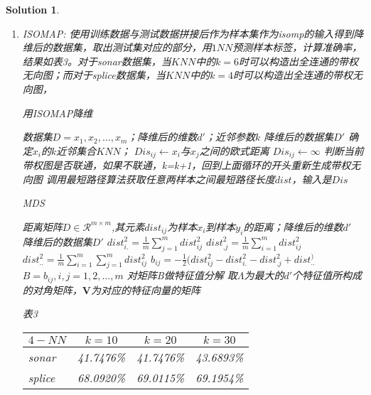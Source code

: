 \documentclass[a4paper,UTF8]{article}
\numberwithin{equation}{section}
\newtheorem*{solution}{Solution}
\begin{document}
\begin{solution}
\begin{enumerate}
			\item ISOMAP:
			\subitem 使用训练数据与测试数据拼接后作为样本集作为isomp的输入得到降维后的数据集，取出测试集对应的部分，用$1NN$预测样本标签，计算准确率，结果如表3。对于sonar数据集，当$KNN$中的$k=6$时可以构造出全连通的带权无向图；而对于splice数据集，当$KNN$中的$k=4$时可以构造出全连通的带权无向图，
			\begin{algorithm}
				\caption{用ISOMAP降维}
				\begin{algorithmic}[1] %
					\Require 数据集$D={x_1,x_2,\ldots,x_m}$；降维后的维数$d'$；近邻参数$k$
					\Ensure 降维后的数据集$D'$
					\State 确定$x_i$的$k$近邻集合$KNN$；
					\State $Dis_{ij} \leftarrow x_i$与$x_j$之间的欧式距离
					\Else
					\State $Dis_{ij} \leftarrow \infty$
					\EndIf
					\EndFor
					\EndFor
					判断当前带权图是否联通，如果不联通，k=k+1，回到上面循环的开头重新生成带权无向图
					\State 调用最短路径算法获取任意两样本之间最短路径长度$dist$，输入是$Dis$
					\State {}
					\EndFunction
				\end{algorithmic}
			\end{algorithm}
			
			\begin{algorithm}
				\caption{MDS}
				\begin{algorithmic}[1] %
					\Require 距离矩阵$D \in \mathcal{R}^{m\times m}$,其元素$dist_{ij}$为样本$x_i$到样本$y_i$的距离；降维后的维数$d'$
					\Ensure 降维后的数据集$D'$
					\Function {MDS}{$D$}
					\State $dist_{i.}^2=\frac{1}{m}\sum_{j=1}^m dist_{ij}^2$
					\State $dist_{.j}^2=\frac{1}{m}\sum_{i=1}^m dist_{ij}^2$
					\State $dist_{..}^2=\frac{1}{m}\sum_{i=1}^m \sum_{j=1}^m dist_{ij}^2$
					\State $b_{ij}=-\frac{1}{2}(dist_{ij}^2 - dist_{i.}^2 - dist_{.j}^2 + dist_{..}^)$
					\State $B={b_{ij}}, i,j=1,2,\ldots,m$
					\State 对矩阵B做特征值分解
					\State 取$\Lambda$为最大的$d'$个特征值所构成的对角矩阵，$\bm{V}$为对应的特征向量的矩阵
					\State \Return{$\Lambda \bm{V}^{1/2} \in \mathcal{R}^{m\times d'}$}
					\EndFunction
				\end{algorithmic}
			\end{algorithm}
			\begin{center}
				表3 \\
			\begin{tabular}{l|c|c|c}
				$4-NN$& $k=10$ & $k=20$ & $k=30$\\
				\hline
				sonar& 41.7476\%& 41.7476\%& 43.6893\%\\
				splice& 68.0920\%& 69.0115\%& 69.1954\%
			\end{tabular}
			\end{center}
		\end{enumerate}
		
		
	\end{solution}
	\newpage
	
	
\end{document}
